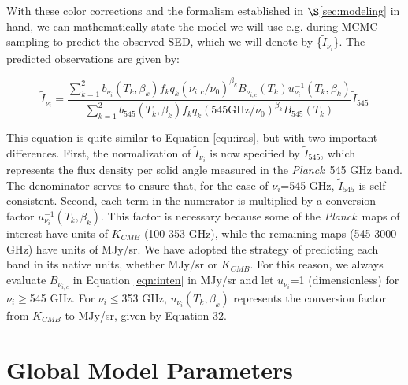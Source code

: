 \documentclass{emulateapj}
\newcommand{\PLANCK}{{\it Planck}}
\begin{document}
With these color corrections and the  formalism established in 
$\S$\ref{sec:modeling} in hand, we can mathematically state the model we will 
use e.g. during MCMC sampling to predict the observed SED, which we will 
denote by \{$\tilde{I}_{\nu_i}$\}. The predicted observations are given by:

\begin{equation}
\label{eqn:inten}
\tilde{I}_{\nu_i} = \frac{\sum\limits_{k=1}^{2} b_{\nu_i}(T_k, \beta_k) f_k q_k (\nu_{i,c}/\nu_0)^{\beta_k} B_{\nu_{i,c}}(T_k) u_{\nu_i}^{-1}(T_k, \beta_k)}{\sum\limits_{k=1}^{2} b_{545}(T_k, \beta_k) f_k q_k (545 \textrm{GHz}/\nu_0)^{\beta_k} B_{545}(T_k)}\tilde{I}_{545}
\end{equation}

This equation is quite similar to Equation \ref{equ:iras}, but with two 
important differences. First, the normalization of $\tilde{I}_{\nu_i}$ is now 
specified by $\tilde{I}_{545}$, which represents the flux density per solid
angle measured in the \PLANCK~545 GHz band. The denominator serves to ensure 
that, for the case of $\nu_i$=545 GHz, $\tilde{I}_{545}$ is self-consistent. 
Second, each term in the numerator is multiplied by a conversion factor 
$u_{\nu_i}^{-1}(T_k, \beta_k)$. This factor is necessary because some of the 
\PLANCK~maps of interest have units of $K_{CMB}$ (100-353 GHz), while the
remaining maps (545-3000 GHz) have units of MJy/sr. We have adopted the 
strategy of predicting each band in its native units, whether MJy/sr or 
$K_{CMB}$. For this reason, we always evaluate $B_{\nu_{i,c}}$ in Equation 
\ref{eqn:inten} in MJy/sr and let $u_{\nu_i}$=1 (dimensionless) for 
$\nu_i$$\ge$545 GHz. For $\nu_i$$\le$353 GHz, $u_{\nu_i}(T_k, \beta_k)$ 
represents the conversion factor from $K_{CMB}$ to MJy/sr, given by 
\cite{planckresponse} Equation 32.





\section{Global Model Parameters}
\label{sec:global}
\end{document}

